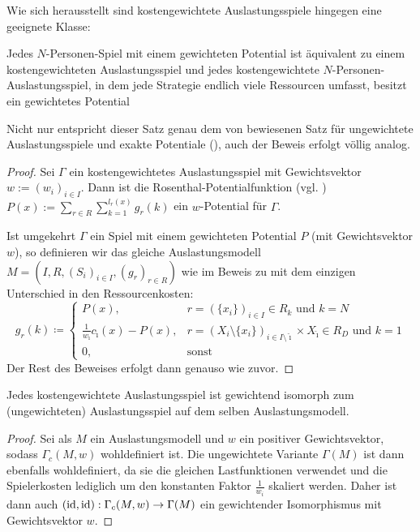 Wie sich herausstellt sind kostengewichtete Auslastungsspiele hingegen eine geeignete Klasse:

\begin{satz}\label{satz:MondererShapleyKostengew}
	Jedes $N$-Personen-Spiel mit einem gewichteten Potential ist äquivalent zu einem kostengewichteten Auslastungsspiel und jedes kostengewichtete $N$-Personen-Auslastungsspiel, in dem jede Strategie endlich viele Ressourcen umfasst, besitzt ein gewichtetes Potential
\end{satz}

Nicht nur entspricht dieser Satz genau dem von \citeauthor{MonShap} bewiesenen Satz für ungewichtete Auslastungsspiele und exakte Potentiale (), auch der Beweis erfolgt völlig analog. 

\begin{proof}
	Sei $\Gamma$ ein kostengewichtetes Auslastungsspiel mit Gewichtsvektor $w := (w_i)_{i\in I}$. Dann ist die Rosenthal-Potentialfunktion (vgl. \cite{RosenthalPotential}) $P(x) := \sum_{r \in R}\sum_{k=1}^{l_r(x)}g_r(k)$ ein $w$-Potential für $\Gamma$.
		
	Ist umgekehrt $\Gamma$ ein Spiel mit einem gewichteten Potential $P$ (mit Gewichtsvektor $w$), so definieren wir das gleiche Auslastungsmodell $M = (I, R, (S_i)_{i \in I}, (g_r)_{r \in R})$ wie im Beweis zu  mit dem einzigen Unterschied in den Ressourcenkosten:
		\[g_r(k) \coloneqq 
		\begin{cases}
		P(x), 									&r = \left(\{x_i\}\right)_{i \in I} \in R_k 													\text{ und } k=N \\
		\frac{1}{w_{\hat{\imath}}}c_{\hat{\imath}}(x) - P(x), 	&r = \left(X_i\setminus\{x_i\}\right)_{i \in I\setminus\hat{\imath}} \times X_{\hat{\imath}} \in R_D 	\text{ und } k=1 \\
		0,										&\text{sonst}
		\end{cases}\]
	Der Rest des Beweises erfolgt dann genauso wie zuvor.
\end{proof}

\begin{lemma}\label{lemma:KostengewAuslIsomZuAusl}
	Jedes kostengewichtete Auslastungsspiel ist gewichtend isomorph zum (ungewichteten) Auslastungsspiel auf dem selben Auslastungsmodell.
\end{lemma}

\begin{proof}
	Sei als $M$ ein Auslastungsmodell und $w$ ein positiver Gewichtsvektor, sodass $\Gamma_c(M, w)$ wohldefiniert ist. Die ungewichtete Variante $\Gamma(M)$ ist dann ebenfalls wohldefiniert, da sie die gleichen Lastfunktionen verwendet und die Spielerkosten lediglich um den konstanten Faktor $\frac{1}{w_i}$ skaliert werden. Daher ist dann auch $(\mathrm{id}, \mathrm{id}): \Gamma_c(M,w) \to \Gamma(M)$ ein gewichtender Isomorphismus mit Gewichtsvektor $w$.
\end{proof}


